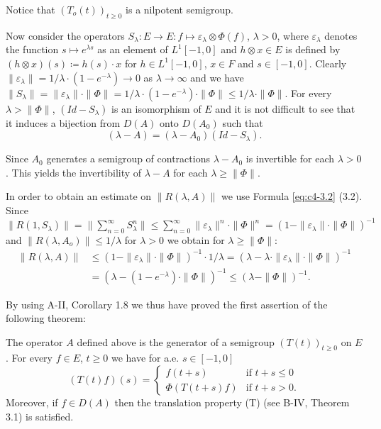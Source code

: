 Notice that $(T_o(t))_{t \geq 0}$ is a nilpotent semigroup.

Now consider the operators $S_{\lambda} : E \to E : f \mapsto \varepsilon_{\lambda} \otimes \Phi(f)$, $\lambda > 0$, where $\varepsilon_{\lambda}$ denotes the function $s \mapsto e^{\lambda s}$ as an element of $L^{1}[-1,0]$ and $h \otimes x \in E$ is defined by $(h \otimes x)(s) \coloneqq h(s) \cdot x$ for $h \in L^{1}[-1,0]$, $x \in F$ and $s \in [-1,0]$.
Clearly $\|\varepsilon_{\lambda}\| = 1/\lambda \cdot (1 - e^{-\lambda}) \to 0$ as $\lambda \to \infty$ and we have $\|S_{\lambda}\| = \|\varepsilon_{\lambda}\| \cdot \|\Phi\| = 1/\lambda \cdot (1 - e^{-\lambda}) \cdot \|\Phi\| \leq 1/\lambda \cdot \|\Phi\|$.
For every $\lambda > \|\Phi\|$, $(Id - S_{\lambda})$ is an isomorphism of $E$ and it is not difficult to see that it induces a bijection from $D(A)$ onto $D(A_{0})$ such that
\begin{equation}\label{eq:c4-3.2}
(\lambda - A) = (\lambda - A_{0})(Id - S_{\lambda}).
\end{equation}

Since $A_{0}$ generates a semigroup of contractions $\lambda - A_{0}$ is invertible for each $\lambda > 0$.
This yields the invertibility of $\lambda - A$ for each $\lambda \geq \|\Phi\|$.

In order to obtain an estimate on $\|R(\lambda,A)\|$ we use Formula \eqref{eq:c4-3.2} (3.2).
Since $\|R(1,S_{\lambda})\| = \|\sum_{n=0}^{\infty} S_{\lambda}^n\| \leq \sum_{n=0}^{\infty} \|\varepsilon_{\lambda}\|^n \cdot \|\Phi\|^n = (1-\|\varepsilon_{\lambda}\| \cdot \|\Phi\|)^{-1}$ and $\|R(\lambda,A_o)\| \leq 1/\lambda$ for $\lambda > 0$ we obtain for $\lambda \geq \|\Phi\|$:
\begin{align*}
\|R(\lambda,A)\| &\leq (1 - \|\varepsilon_{\lambda}\| \cdot \|\Phi\|)^{-1} \cdot 1/\lambda = (\lambda - \lambda \cdot \|\varepsilon_{\lambda}\| \cdot \|\Phi\|)^{-1} \\
&= (\lambda - (1 - e^{-\lambda}) \cdot \|\Phi\|)^{-1} \leq (\lambda - \|\Phi\|)^{-1}.
\end{align*}

By using A-II, Corollary 1.8 we thus have proved the first assertion of the following theorem:

\begin{theorem}\label{thm:c4-3.1}
The operator $A$ defined above is the generator of a semigroup $(T(t))_{t \geq 0}$ on $E$.
For every $f \in E$, $t \geq 0$ we have for a.e. $s \in [-1,0]$
\begin{equation}\label{eq:c4-3.3}
(T(t)f)(s) = \begin{cases}
    f(t+s) & \text{if } t+s \leq 0 \\
    \Phi(T(t+s)f) & \text{if } t+s > 0.
\end{cases}
\end{equation}
Moreover, if $f \in D(A)$ then the translation property (T) (see B-IV, Theorem 3.1) is satisfied.
\end{theorem}

